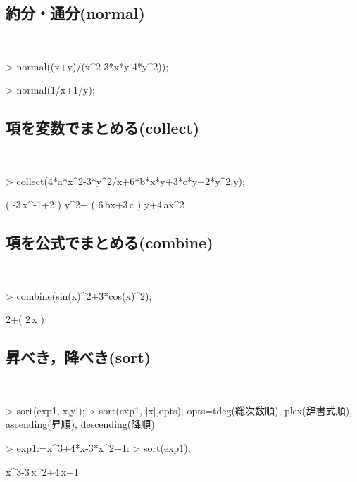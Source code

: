 \subsection{約分・通分(normal)}　
\begin{MapleInput}
> normal((x+y)/(x^2-3*x*y-4*y^2));
\end{MapleInput}
\begin{MapleOutput}
\end{MapleOutput}
\begin{MapleInput}
> normal(1/x+1/y);
 \end{MapleInput}
\begin{MapleOutput}
{}
\end{MapleOutput}

\subsection{項を変数でまとめる(collect)}　
\begin{MapleInput}
> collect(4*a*x^2-3*y^2/x+6*b*x*y+3*c*y+2*y^2,y);
\end{MapleInput}
\begin{MapleOutput}
\left( -3\,{x}^{-1}+2 \right) {y}^{2}+ \left( 6\,bx+3\,c \right) y+4\,a{x}^{2}
\end{MapleOutput}

\subsection{項を公式でまとめる(combine)}　
\begin{MapleInput}
> combine(sin(x)^2+3*cos(x)^2);
\end{MapleInput}
\begin{MapleOutput}
2+\cos \left( 2\,x \right)
\end{MapleOutput}

\subsection{昇べき，降べき(sort)}　
\begin{MapleInput}
> sort(exp1,[x,y]); 
> sort(exp1, [x],opts);
opts=tdeg(総次数順), plex(辞書式順), ascending(昇順), descending(降順)
\end{MapleInput}

\begin{MapleInput}
> exp1:=x^3+4*x-3*x^2+1: 
> sort(exp1);
\end{MapleInput}
\begin{MapleOutput}
{x}^{3}-3\,{x}^{2}+4\,x+1
\end{MapleOutput}

